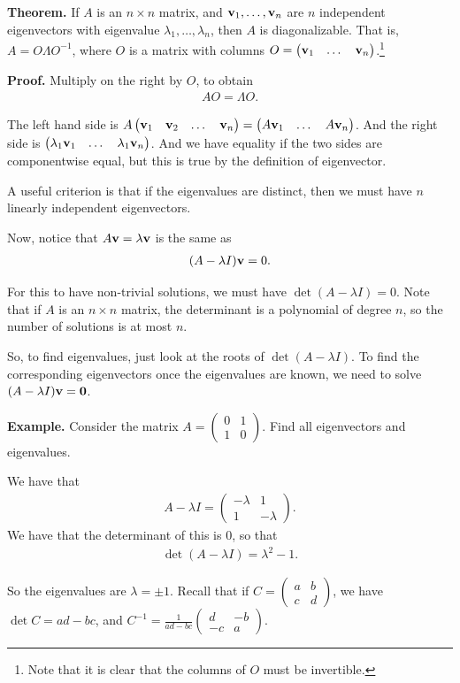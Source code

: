 \documentclass{article}
\newcommand{\mat}[1]{\begin{pmatrix}#1\end{pmatrix}}
\begin{document}
{\bf Theorem.} If $A$ is an $n \times n$ matrix, and $\mathbf{v}_1, \dots, \mathbf{v}_n$ are $n$ independent eigenvectors with eigenvalue $\lambda_1, \dots, \lambda_n$, then $A$ is diagonalizable.  That is, $A = O \Lambda O^{-1}$, where $O$ is a matrix with columns $O = \mat{\mbf{v}_1 & \dots & \mbf{v}_n}$.\footnote{Note that it is clear that the columns of $O$ must be invertible.}

{\bf Proof.} Multiply on the right by $O$, to obtain
\begin{align*}
  AO = \Lambda O.
\end{align*}

The left hand side is $A \mat{\mbf{v}_1 & \mbf{v}_2 & \dots & \mbf{v}_n} = \mat{A \mbf{v}_1 & \dots & A \mbf{v}_n}$.  And the right side is $\mat{\lambda_1 \mbf{v}_1 & \dots & \lambda_1 \mbf{v}_n}$.  And we have equality if the two sides are componentwise equal, but this is true by the definition of eigenvector.

A useful criterion is that if the eigenvalues are distinct, then we must have $n$ linearly independent eigenvectors.

Now, notice that $A \mathbf{v} = \lambda \mathbf{v}$ is the same as
\begin{align*}
  (A - \lambda I) \mathbf{v} = 0.
\end{align*}

For this to have non-trivial solutions, we must have $\det(A - \lambda I) = 0$. Note that if $A$ is an $n \times n$ matrix, the determinant is a polynomial of degree $n$, so the number of solutions is at most $n$.

So, to find eigenvalues, just look at the roots of $\det (A - \lambda I)$.  To find the corresponding eigenvectors once the eigenvalues are known, we need to solve $(A - \lambda I) \mathbf{v} = \mathbf{0}$.

{\bf Example.} Consider the matrix $A = \mat{0 & 1 \\ 1 & 0}$.  Find all eigenvectors and eigenvalues.

We have that
\begin{align*}
  A - \lambda I =  \mat{- \lambda & 1 \\ 1 & - \lambda}.
\end{align*}
We have that the determinant of this is 0, so that
\begin{align*}
  \det(A - \lambda I) = \lambda^2 -1.  
\end{align*}

So the eigenvalues are $\lambda = \pm 1$. Recall that if $C = \mat{a & b \\ c & d}$, we have $\det C = ad - bc$, and $C^{-1} = \frac{1}{ad-bc} \mat{d & -b \\ -c & a}$.
\end{document}
